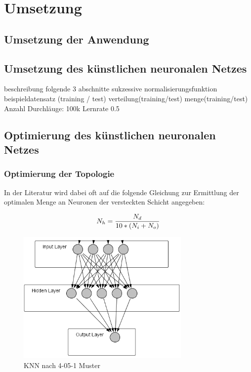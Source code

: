 \chapter{Umsetzung} %

\section{Umsetzung der Anwendung} %

\section{Umsetzung des künstlichen neuronalen Netzes} %

beschreibung folgende 3 abschnitte sukzessive
normalisierungsfunktion
beispieldatensatz (training / test)
verteilung(training/test)
menge(training/test)
Anzahl Durchläuge: 100k
Lernrate 0.5


\section{Optimierung des künstlichen neuronalen Netzes}
\label{section:Optimierung des künstlischen neuronalen Netzes}
\subsection{Optimierung der Topologie} %
In der Literatur wird dabei oft auf die folgende Gleichung zur Ermittlung der optimalen  Menge an Neuronen der versteckten Schicht angegeben:

\begin{equation}\formelentry{Optimale Anzahl Neuronen in der versteckten Schicht}
  N_h = \frac{N_d}{10*(N_i+N_o)}
\end{equation}


\begin{figure}[htbp]
\centering
		\includegraphics[width=0.75\textwidth]{4-5-1.PNG}
	\caption{KNN nach 4-05-1 Muster}
	\label{fig:KNN nach 4-05-1 Muster}
\end{figure}


